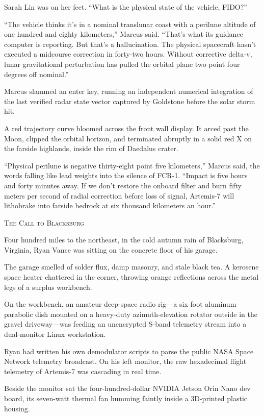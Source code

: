 \documentclass[12pt,twoside,openright]{book}
\newcommand{\sceneheader}[1]{%
  \par\vspace{1.8em}%
  {\noindent\centering\scshape\large #1\par}%
  \vspace{1.0em}%
  \noindent%
}
\newcommand{\dinkus}{%
  \par\vspace{1.2em}%
  {\noindent\centering{\large $\ast\quad\ast\quad\ast$}\par}%
  \vspace{1.2em}%
  \noindent%
}
\begin{document}
Sarah Lin was on her feet. ``What is the physical state of the vehicle,
FIDO?''

``The vehicle thinks it's in a nominal translunar coast with a perilune
altitude of one hundred and eighty kilometers,'' Marcus said. ``That's
what its guidance computer is reporting. But that's a hallucination. The
physical spacecraft hasn't executed a midcourse correction in forty-two
hours. Without corrective delta-v, lunar gravitational perturbation has
pulled the orbital plane two point four degrees off nominal.''

Marcus slammed an enter key, running an independent numerical
integration of the last verified radar state vector captured by
Goldstone before the solar storm hit.

A red trajectory curve bloomed across the front wall display. It arced
past the Moon, clipped the orbital horizon, and terminated abruptly in a
solid red X on the farside highlands, inside the rim of Daedalus crater.

``Physical perilune is negative thirty-eight point five kilometers,''
Marcus said, the words falling like lead weights into the silence of
FCR-1. ``Impact is five hours and forty minutes away. If we don't
restore the onboard filter and burn fifty meters per second of radial
correction before loss of signal, Artemis-7 will lithobrake into farside
bedrock at six thousand kilometers an hour.''

\dinkus

\sceneheader{The Call to Blacksburg}

Four hundred miles to the northeast, in the cold autumn rain of
Blacksburg, Virginia, Ryan Vance was sitting on the concrete floor of
his garage.

The garage smelled of solder flux, damp masonry, and stale black tea. A
kerosene space heater chattered in the corner, throwing orange
reflections across the metal legs of a surplus workbench.

On the workbench, an amateur deep-space radio rig---a six-foot aluminum
parabolic dish mounted on a heavy-duty azimuth-elevation rotator outside
in the gravel driveway---was feeding an unencrypted S-band telemetry
stream into a dual-monitor Linux workstation.

Ryan had written his own demodulator scripts to parse the public NASA
Space Network telemetry broadcast. On his left monitor, the raw
hexadecimal flight telemetry of Artemis-7 was cascading in real time.

Beside the monitor sat the four-hundred-dollar NVIDIA Jetson Orin Nano
dev board, its seven-watt thermal fan humming faintly inside a
3D-printed plastic housing.
\end{document}
